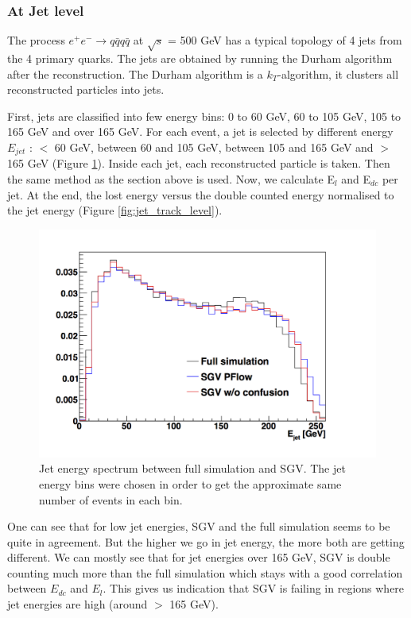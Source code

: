 \subsubsection{At Jet level}

The process $e^+e^- \rightarrow q\bar{q} q\bar{q}$ at $\sqrt{s}$ = 500 GeV has a typical topology of 4 jets from the 4 primary quarks. The jets are obtained by running the Durham algorithm after the reconstruction. The Durham algorithm is a $k_T$-algorithm, it clusters all reconstructed particles into jets.

First, jets are classified into few energy bins: 0 to 60 GeV, 60 to 105 GeV, 105 to 165 GeV and over 165 GeV. For each event, a jet is selected by different energy $E_{jet}$ :  $<$ 60 GeV, between 60 and 105 GeV, between 105 and 165 GeV and $>$ 165 GeV (Figure \ref{fig:jet_spec}). Inside each jet,  each reconstructed particle is taken. Then the same method as the section above is used. Now, we calculate E$_l$ and E$_{dc}$ per jet. At the end, the lost energy versus the double counted energy normalised to the jet energy (Figure \ref{fig:jet_track_level}).

\begin{figure}[t]
  \centering
  \includegraphics[scale=0.5]{chap6/fig_SGV/Jet_spectrum.png}
  \caption{Jet energy spectrum between full simulation and SGV. The jet energy bins were chosen in order to get the approximate same number of events in each bin.}
  \label{fig:jet_spec}
\end{figure}

One can see that for low jet energies, SGV and the full simulation seems to be quite in agreement. But the higher we go in jet energy, the more both are getting different. We can mostly see that for jet energies over 165 GeV, SGV is double counting much more than the full simulation which stays with a good correlation between $E_{dc}$ and $E_{l}$. This gives us indication that SGV is failing in regions where jet energies are high (around $>$ 165 GeV).

